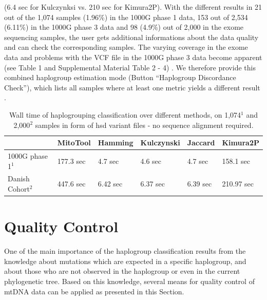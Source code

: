 (6.4 sec for Kulczynksi vs. 210 sec for Kimura2P). With the different results in 21 out of the 1,074
samples (1.96\%) in the 1000G phase 1 data, 153 out of 2,534 (6.11\%) in the 1000G phase 3 data
and 98 (4.9\%) out of 2,000 in the exome sequencing samples, the user gets additional informations
about the data quality and can check the corresponding samples. The varying coverage in the exome data and problems with the VCF file in the 1000G phase 3 data become apparent (see Table 1
and Supplemental Material Table 2 - 4) \cite{Weissensteiner2016a}. We therefore provide this combined haplogroup estimation
mode (Button “Haplogroup Discordance Check”), which lists all samples where at least one metric
yields a different result \cite{Weissensteiner2016a}.

\begin{table}[H]
\centering

\begin{tabular}{|l|l|l|l|l|l|}
\hline
              & MitoTool  & Hamming  & Kulczynski & Jaccard  & Kimura2P   \\ \hline
1000G phase 1$^{1}$ & 177.3 sec & 4.7 sec  & 4.6 sec    & 4.7 sec  & 158.1 sec  \\ \hline
Danish Cohort$^{2}$ & 447.6 sec & 6.42 sec & 6.37 sec   & 6.39 sec & 210.97 sec \\ \hline
\end{tabular}
\caption{Wall time of haplogrouping classification over different methods, on 1,074$^{1}$ and 2,000$^{2}$ samples in form of hsd variant files - no sequence alignment required. }
\label{table:speed}
\end{table}



\section{Quality Control}\label{hg:qc}
One of the main importance of the haplogroup classification results from the knowledge about mutations which are expected in a specific haplogroup, and about those who are not observed in the haplogroup or even in the current phylogenetic tree. Based on this knowledge, several means for quality control of mtDNA data can be applied as presented in this Section.
